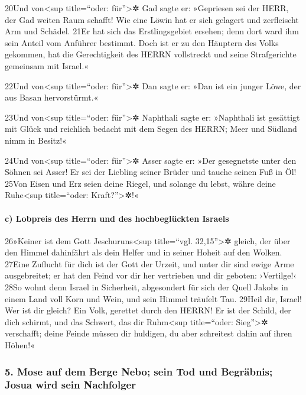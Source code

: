 20Und von\textless sup title=``oder: für''\textgreater✲ Gad sagte er:
»Gepriesen sei der HERR, der Gad weiten Raum schafft! Wie eine Löwin hat
er sich gelagert und zerfleischt Arm und Schädel. 21Er hat sich das
Erstlingsgebiet ersehen; denn dort ward ihm sein Anteil vom Anführer
bestimmt. Doch ist er zu den Häuptern des Volks gekommen, hat die
Gerechtigkeit des HERRN vollstreckt und seine Strafgerichte gemeinsam
mit Israel.«

22Und von\textless sup title=``oder: für''\textgreater✲ Dan sagte er:
»Dan ist ein junger Löwe, der aus Basan hervorstürmt.«

23Und von\textless sup title=``oder: für''\textgreater✲ Naphthali sagte
er: »Naphthali ist gesättigt mit Glück und reichlich bedacht mit dem
Segen des HERRN; Meer und Südland nimm in Besitz!«

24Und von\textless sup title=``oder: für''\textgreater✲ Asser sagte er:
»Der gesegnetste unter den Söhnen sei Asser! Er sei der Liebling seiner
Brüder und tauche seinen Fuß in Öl! 25Von Eisen und Erz seien deine
Riegel, und solange du lebst, währe deine Ruhe\textless sup
title=``oder: Kraft?''\textgreater✲!«

\hypertarget{c-lobpreis-des-herrn-und-des-hochbegluxfcckten-israels}{%
\paragraph{c) Lobpreis des Herrn und des hochbeglückten
Israels}\label{c-lobpreis-des-herrn-und-des-hochbegluxfcckten-israels}}

26»Keiner ist dem Gott Jeschuruns\textless sup title=``vgl.
32,15''\textgreater✲ gleich, der über den Himmel dahinfährt als dein
Helfer und in seiner Hoheit auf den Wolken. 27Eine Zuflucht für dich ist
der Gott der Urzeit, und unter dir sind ewige Arme ausgebreitet; er hat
den Feind vor dir her vertrieben und dir geboten: ›Vertilge!‹ 28So wohnt
denn Israel in Sicherheit, abgesondert für sich der Quell Jakobs in
einem Land voll Korn und Wein, und sein Himmel träufelt Tau. 29Heil dir,
Israel! Wer ist dir gleich? Ein Volk, gerettet durch den HERRN! Er ist
der Schild, der dich schirmt, und das Schwert, das dir Ruhm\textless sup
title=``oder: Sieg''\textgreater✲ verschafft; deine Feinde müssen dir
huldigen, du aber schreitest dahin auf ihren Höhen!«

\hypertarget{mose-auf-dem-berge-nebo-sein-tod-und-begruxe4bnis-josua-wird-sein-nachfolger}{%
\subsubsection{5. Mose auf dem Berge Nebo; sein Tod und Begräbnis; Josua
wird sein
Nachfolger}\label{mose-auf-dem-berge-nebo-sein-tod-und-begruxe4bnis-josua-wird-sein-nachfolger}}

